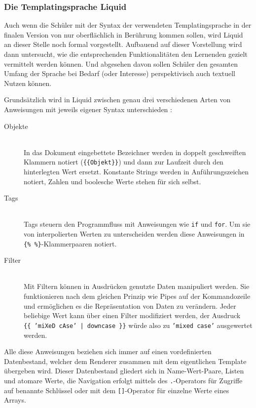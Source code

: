 \subsubsection{Die Templatingsprache Liquid}

Auch wenn die Schüler mit der Syntax der verwendeten Templatingsprache in der finalen Version von \idename{} nur oberflächlich in Berührung kommen sollen, wird Liquid an dieser Stelle noch formal vorgestellt. Aufbauend auf dieser Vorstellung wird dann untersucht, wie die entsprechenden Funktionalitäten den Lernenden gezielt vermittelt werden können. Und abgesehen davon sollen Schüler den gesamten Umfang der Sprache bei Bedarf (oder Interesse) perspektivisch auch textuell Nutzen können.

Grundsätzlich wird in Liquid zwischen genau drei verschiedenen Arten von Anweisungen mit jeweils eigener Syntax unterschieden \cite{liquid-introduction}:

\begin{description}
\item[Objekte] \hfill \\
  In das Dokument eingebettete Bezeichner werden in doppelt geschweiften Klammern notiert (\texttt{\{\{Objekt\}\}}) und dann zur Laufzeit durch den hinterlegten Wert ersetzt. Konstante Strings werden in Anführungszeichen notiert, Zahlen und boolesche Werte stehen für sich selbst.
\item[Tags] \hfill \\
  Tags steuern den Programmfluss mit Anweisungen wie \texttt{if} und \texttt{for}. Um sie von interpolierten Werten zu unterscheiden werden diese Anweisungen in \texttt{\{\% \%\}}-Klam\-mer\-paaren notiert.
\item[Filter] \hfill \\
  Mit Filtern können in Ausdrücken genutzte Daten manipuliert werden. Sie funktionieren nach dem gleichen Prinzip wie Pipes auf der Kommandozeile und ermöglichen es die Repräsentation von Daten zu verändern. Jeder beliebige Wert kann über einen Filter modifiziert werden, der Ausdruck \texttt{\{\{~'miXeD cAse'~|~downcase~\}\}} würde also zu \texttt{'mixed case'} ausgewertet werden.
\end{description}

Alle diese Anweisungen beziehen sich immer auf einen vordefinierten Datenbestand, welcher dem Renderer zusammen mit dem eigentlichen Template übergeben wird. Dieser Datenbestand gliedert sich in Name-Wert-Paare, Listen und atomare Werte, die Navigation erfolgt mittels des \texttt{.}-Operators für Zugriffe auf benannte Schlüssel oder mit dem \texttt{[]}-Operator für einzelne Werte eines Arrays.

